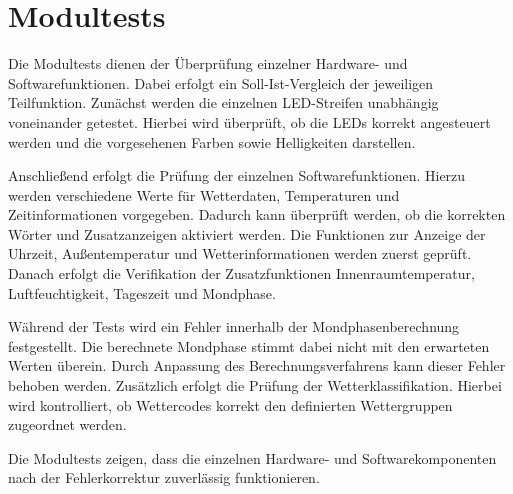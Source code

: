 \section{Modultests} 
Die Modultests dienen der Überprüfung einzelner Hardware- und Softwarefunktionen.  
Dabei erfolgt ein Soll-Ist-Vergleich der jeweiligen Teilfunktion.  
Zunächst werden die einzelnen LED-Streifen unabhängig voneinander getestet.  
Hierbei wird überprüft, ob die LEDs korrekt angesteuert werden und die vorgesehenen Farben sowie Helligkeiten darstellen.  

Anschließend erfolgt die Prüfung der einzelnen Softwarefunktionen.  
Hierzu werden verschiedene Werte für Wetterdaten, Temperaturen und Zeitinformationen vorgegeben.  
Dadurch kann überprüft werden, ob die korrekten Wörter und Zusatzanzeigen aktiviert werden.  
Die Funktionen zur Anzeige der Uhrzeit, Außentemperatur und Wetterinformationen werden zuerst geprüft.  
Danach erfolgt die Verifikation der Zusatzfunktionen Innenraumtemperatur, Luftfeuchtigkeit, Tageszeit und Mondphase.  

Während der Tests wird ein Fehler innerhalb der Mondphasenberechnung festgestellt.  
Die berechnete Mondphase stimmt dabei nicht mit den erwarteten Werten überein.  
Durch Anpassung des Berechnungsverfahrens kann dieser Fehler behoben werden.  
Zusätzlich erfolgt die Prüfung der Wetterklassifikation.  
Hierbei wird kontrolliert, ob Wettercodes korrekt den definierten Wettergruppen zugeordnet werden.  

Die Modultests zeigen, dass die einzelnen Hardware- und Softwarekomponenten nach der Fehlerkorrektur zuverlässig funktionieren.  